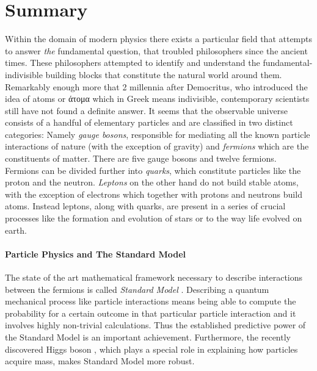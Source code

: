 \chapter*{Summary}
\chaptermark{}
%

Within the domain of modern physics there exists a particular field
that attempts to answer {\it the} fundamental question, that troubled philosophers since the ancient times.
These philosophers attempted to identify and understand the fundamental-indivisible building blocks that constitute the natural world
around them. Remarkably enough more that 2 millennia after Democritus, who introduced
the idea of atoms or \textgreek{άτομα} which in Greek means indivisible,
contemporary scientists still have not found a definite answer.
It seems that the observable universe consists of a handful of elementary particles and are classified in two distinct categories:
Namely {\it gauge bosons}, responsible for mediating all the known particle interactions of
nature (with the exception of gravity) and {\it fermions} which are the constituents of
matter. There are five gauge bosons and twelve fermions. Fermions can be divided further
into {\it quarks}, which constitute particles like the proton and the neutron. {\it Leptons}
on the other hand do not build stable atoms, with the exception of electrons which together with
protons and neutrons build atoms. Instead leptons, along with quarks, are present in a series of crucial processes
like the formation and evolution of stars or to the way life evolved on earth.


\subsubsection{Particle Physics and The Standard Model}
The state of the art mathematical framework necessary to describe interactions between the
fermions is called \textit{Standard Model} \cite{sm-glashow,sm-weinberg,sm-salam}.
Describing a quantum mechanical process like particle interactions means being able
to compute the probability for a certain outcome in that particular particle interaction
and it involves highly non-trivial calculations. Thus the established predictive power of
the Standard Model is an important achievement. Furthermore, the recently
discovered Higgs boson \cite{higgs-cms,higgs-atlas}, which plays a special role in
explaining how particles acquire mass, makes Standard Model more robust.

